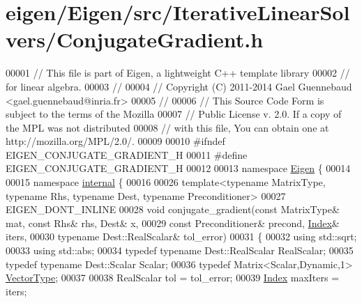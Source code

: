 \hypertarget{eigen_2_eigen_2src_2_iterative_linear_solvers_2_conjugate_gradient_8h_source}{}\section{eigen/\+Eigen/src/\+Iterative\+Linear\+Solvers/\+Conjugate\+Gradient.h}
\label{eigen_2_eigen_2src_2_iterative_linear_solvers_2_conjugate_gradient_8h_source}

\begin{DoxyCode}
00001 \textcolor{comment}{// This file is part of Eigen, a lightweight C++ template library}
00002 \textcolor{comment}{// for linear algebra.}
00003 \textcolor{comment}{//}
00004 \textcolor{comment}{// Copyright (C) 2011-2014 Gael Guennebaud <gael.guennebaud@inria.fr>}
00005 \textcolor{comment}{//}
00006 \textcolor{comment}{// This Source Code Form is subject to the terms of the Mozilla}
00007 \textcolor{comment}{// Public License v. 2.0. If a copy of the MPL was not distributed}
00008 \textcolor{comment}{// with this file, You can obtain one at http://mozilla.org/MPL/2.0/.}
00009 
00010 \textcolor{preprocessor}{#ifndef EIGEN\_CONJUGATE\_GRADIENT\_H}
00011 \textcolor{preprocessor}{#define EIGEN\_CONJUGATE\_GRADIENT\_H}
00012 
00013 \textcolor{keyword}{namespace }\hyperlink{namespace_eigen}{Eigen} \{ 
00014 
00015 \textcolor{keyword}{namespace }\hyperlink{namespaceinternal}{internal} \{
00016 
00026 \textcolor{keyword}{template}<\textcolor{keyword}{typename} MatrixType, \textcolor{keyword}{typename} Rhs, \textcolor{keyword}{typename} Dest, \textcolor{keyword}{typename} Preconditioner>
00027 EIGEN\_DONT\_INLINE
00028 \textcolor{keywordtype}{void} conjugate\_gradient(\textcolor{keyword}{const} MatrixType& mat, \textcolor{keyword}{const} Rhs& rhs, Dest& x,
00029                         \textcolor{keyword}{const} Preconditioner& precond, \hyperlink{namespace_eigen_a62e77e0933482dafde8fe197d9a2cfde}{Index}& iters,
00030                         \textcolor{keyword}{typename} Dest::RealScalar& tol\_error)
00031 \{
00032   \textcolor{keyword}{using} std::sqrt;
00033   \textcolor{keyword}{using} std::abs;
00034   \textcolor{keyword}{typedef} \textcolor{keyword}{typename} Dest::RealScalar RealScalar;
00035   \textcolor{keyword}{typedef} \textcolor{keyword}{typename} Dest::Scalar Scalar;
00036   \textcolor{keyword}{typedef} Matrix<Scalar,Dynamic,1> \hyperlink{struct_vector_type}{VectorType};
00037   
00038   RealScalar tol = tol\_error;
00039   \hyperlink{namespace_eigen_a62e77e0933482dafde8fe197d9a2cfde}{Index} maxIters = iters;

\end{DoxyCode}
